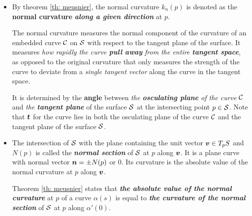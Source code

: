 \documentclass[11pt]{article}
\begin{document}
\begin{itemize}
\begin{proof}
In other words, the value of \underline{\textbf{second fundamental form}} $\Pi_{p}(\mb{v})$ for unit vector $\mb{v}\in T_{p}S$ \textbf{is equal to} \underline{\textbf{the normal curvature}} of a regular curve passing through $p$ and tangent to $\mb{v}$. If $\mb{v}_{1} = \mb{v}_{2}$ for two curves $\cC_{1}$ and $\cC_{2}$, then $\Pi_{p}(\mb{v}_{1}) = k_{n1} = k_{n2} = \Pi_{p}(\mb{v}_{2})$. \QEDA
\end{proof}
The second fundamental form $\Pi_{p}(\mb{v})$ for any unit vector $\mb{v}\in T_{p}S$ is the \emph{normal curvature} of the $\cC$ passing through $p$ with $\alpha'(0) = \mb{v}$.

In fact, the \emph{\textbf{second fundamental form}} is the component of the \emph{second derivative} of parameterization $\mb{x}(u(t), v(t))$ \emph{\textbf{perpendicular}} to the \textbf{tangent plane} of $\cS$.

\item By theorem \ref{th: meusnier}, the normal curvature $k_{n}(p)$ is denoted as the \textbf{normal curvature} \emph{\textbf{along a given direction}} at $p$. 

The normal curvature measures the normal component of the curvature of an embedded curve $\cC$ on $\cS$ with respect to the tangent plane of the surface. It measures \emph{how rapidly the curve \textbf{pull away} from the entire \textbf{tangent space}}, as opposed to the original curvature that only measures the strength of the curve to deviate from a \emph{single tangent vector} along the curve in the tangent space. 

It is determined by the \textbf{angle} between \emph{the \textbf{osculating plane} of the curve} $\cC$ and \emph{the \textbf{tangent plane}} of the surface $\cS$ at the intersecting point $p\in {\mathcal S}$. Note that $\boldsymbol{t}$ for the curve lies in both the osculating plane of the curve $\cC$ and the tangent plane of the surface $\cS$.


\item The intersection of $\cS$ with the plane containing the unit vector $\mb{v}\in T_{p}S$ and $N(p)$ is called the \emph{\textbf{normal section}} of $\cS$ at $p$ along $\mb{v}$. It is a plane curve with normal vector $\boldsymbol{n} = \pm N(p)$ or $0$. Its curvature is the absolute value of the normal curvature at $p$ along $\mb{v}$. 

Theorem \ref{th: meusnier} states that \emph{\textbf{the absolute value of the normal curvature}} at $p$ of a curve $\alpha(s)$ is equal to \emph{\textbf{the curvature of the normal section}} of $\cS$ at $p$ along $\alpha'(0)$.


\end{itemize}
\end{document}
